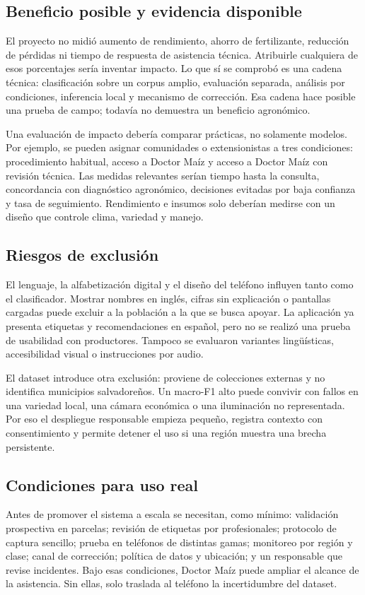 \subsection{Beneficio posible y evidencia disponible}

El proyecto no midió aumento de rendimiento, ahorro de fertilizante, reducción
de pérdidas ni tiempo de respuesta de asistencia técnica. Atribuirle cualquiera
de esos porcentajes sería inventar impacto. Lo que sí se comprobó es una cadena
técnica: clasificación sobre un corpus amplio, evaluación separada, análisis
por condiciones, inferencia local y mecanismo de corrección. Esa cadena hace
posible una prueba de campo; todavía no demuestra un beneficio agronómico.

Una evaluación de impacto debería comparar prácticas, no solamente modelos.
Por ejemplo, se pueden asignar comunidades o extensionistas a tres condiciones:
procedimiento habitual, acceso a Doctor Maíz y acceso a Doctor Maíz con revisión
técnica. Las medidas relevantes serían tiempo hasta la consulta, concordancia
con diagnóstico agronómico, decisiones evitadas por baja confianza y tasa de
seguimiento. Rendimiento e insumos solo deberían medirse con un diseño que
controle clima, variedad y manejo.

\subsection{Riesgos de exclusión}

El lenguaje, la alfabetización digital y el diseño del teléfono influyen tanto
como el clasificador. Mostrar nombres en inglés, cifras sin explicación o
pantallas cargadas puede excluir a la población a la que se busca apoyar. La
aplicación ya presenta etiquetas y recomendaciones en español, pero no se
realizó una prueba de usabilidad con productores. Tampoco se evaluaron
variantes lingüísticas, accesibilidad visual o instrucciones por audio.

El dataset introduce otra exclusión: proviene de colecciones externas y no
identifica municipios salvadoreños. Un macro-F1 alto puede convivir con fallos
en una variedad local, una cámara económica o una iluminación no representada.
Por eso el despliegue responsable empieza pequeño, registra contexto con
consentimiento y permite detener el uso si una región muestra una brecha
persistente.

\subsection{Condiciones para uso real}

Antes de promover el sistema a escala se necesitan, como mínimo: validación
prospectiva en parcelas; revisión de etiquetas por profesionales; protocolo de
captura sencillo; prueba en teléfonos de distintas gamas; monitoreo por región
y clase; canal de corrección; política de datos y ubicación; y un responsable
que revise incidentes. Bajo esas condiciones, Doctor Maíz puede ampliar el
alcance de la asistencia. Sin ellas, solo traslada al teléfono la incertidumbre
del dataset.
